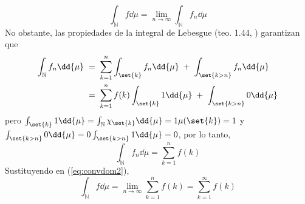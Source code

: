 \begin{sol}
\begin{equation}\label{eq:convdom2}
\int_\mathbb{N}f\dd{\mu} = \lim_{n\to\infty} \int_\mathbb{N}f_n\dd{\mu}
\end{equation}
No obstante, las propiedades de la integral de Lebesgue (teo. 1.44, \cite{Salamon}) garantizan que
\begin{align*}
\int_\mathbb{N}f_n\dd{\mu}%
&\;=\; \sum^n_{k=1}\int_{\set{k}}f_n\dd{\mu} \;+\; \int_{\set{k>n}} f_n\dd{\mu}\\
&\;=\; \sum^n_{k=1}f(k)\int_{\set{k}}1\dd{\mu} \;+\; \int_{\set{k>n}} 0\dd{\mu}\\
\end{align*}
pero $\int_{\set{k}}1\dd{\mu} = \int_{\mathbb{N}}\chi_{\set{k}}\dd{\mu} = 1\mu(\set{k}) = 1$ y $\int_{\set{k>n}} 0\dd{\mu} = 0\int_{\set{k>n}} 1\dd{\mu} = 0$, por lo tanto, 
\[
\int_\mathbb{N}f_n\dd{\mu} = \sum^n_{k=1}f(k)
\] 
Sustituyendo en (\ref{eq:convdom2}),
\[
\int_\mathbb{N}f\dd{\mu} = \lim_{n\to\infty}\sum^n_{k=1}f(k) = \sum^\infty_{k=1}f(k)
\]
\end{sol}